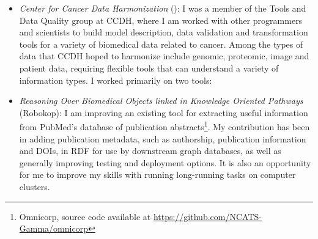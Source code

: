 \begin{itemize}
\item \textit{Center for Cancer Data Harmonization} (): I was a member of the Tools and Data Quality group at CCDH, where I am worked with other programmers and scientists to build model description, data validation and transformation tools for a variety of biomedical data related to cancer. Among the types of data that CCDH hoped to harmonize include genomic, proteomic, image and patient data, requiring flexible tools that can understand a variety of information types. I worked primarily on two tools:

\begin{products}



\end{products}

\begin{comment}

\item \textit{Data modeling and validation with ClinGen} (2019): The ClinGen project is working on developing several data models for recording and sharing information relating to rare genetic variants that may be involved in causing diseases. The current spreadsheet-based data model description requires manual translation into the JSON Schema language to validate data against this specification. I am working with a group of developers to convert the data model into the SHACL shape description language, which could be used both to validate new data and to produce human-readable documentation.

\begin{products}

\product[2]{SHACLI, a command-line tool for validating RDF data against SHACL shapes: \url{https://shacli.org/}, with source code available at \url{https://github.com/gaurav/shacli}}

\end{products}

\end{comment}

\item \textit{Reasoning Over Biomedical Objects linked in Knowledge Oriented Pathways} (Robokop): I am improving an existing tool for extracting useful information from PubMed's database of publication abstracts\footnote{Omnicorp, source code available at \url{https://github.com/NCATS-Gamma/omnicorp}}. My contribution has been in adding publication metadata, such as authorship, publication information and DOIs, in RDF for use by downstream graph databases, as well as generally improving testing and deployment options. It is also an opportunity for me to improve my skills with running long-running tasks on computer clusters.



\end{itemize}
